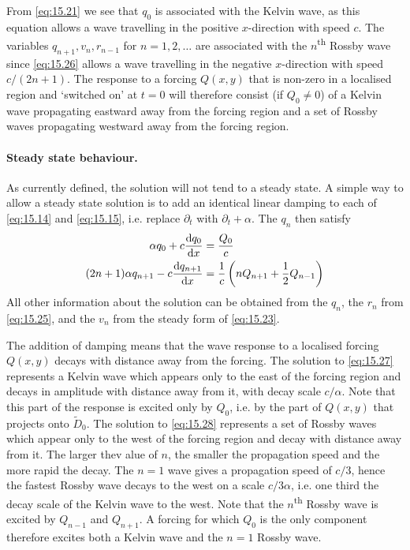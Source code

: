 \documentclass{jknotes}
\begin{document}
From \eqref{eq:15.21} we see that $q_0$ is associated with the Kelvin wave, as
this equation allows a wave travelling in the positive $x$-direction with
speed $c$. The variables $q_{n+1}, v_n, r_{n-1}$ for $n = 1, 2, \dots$ are
associated with the $n$\textsuperscript{th} Rossby wave since
\eqref{eq:15.26} allows a wave travelling in the negative $x$-direction with
speed $c/(2n+1)$. The response to a forcing $Q(x,y)$ that is non-zero in a
localised region and `switched on' at $t=0$ will therefore consist (if $Q_0
\ne 0$) of a Kelvin wave propagating eastward away from the forcing region and
a set of Rossby waves propagating westward away from the forcing region. 

\paragraph{Steady state behaviour.} As currently defined, the solution will
not tend to a steady state. A simple way to allow a steady state solution is
to add an identical linear damping to each of \eqref{eq:15.14} and
\eqref{eq:15.15}, i.e. replace $\partial_t$ with $\partial_t + \alpha$. The
$q_n$ then satisfy
\begin{align}
	\alpha q_0 + c \frac{\diffd q_0}{\diffd x} &= \frac{Q_0}{c}
	\label{eq:15.27}\\
	(2n+1)\alpha q_{n+1} - c\frac{\diffd q_{n+1}}{\diffd x} &=
	\frac{1}{c}\left(nQ_{n+1}+\frac{1}{2}Q_{n-1}\right)\label{eq:15.28}
\end{align}
All other information about the solution can be obtained from the $q_n$, the
$r_n$ from \eqref{eq:15.25}, and the $v_n$ from the steady form of
\eqref{eq:15.23}.

The addition of damping means that the wave response to a localised forcing
$Q(x,y)$ decays with distance away from the forcing. The solution to
\eqref{eq:15.27} represents a Kelvin wave which appears only to the east of
the forcing region and decays in amplitude with distance away from it, with
decay scale $c/\alpha$. Note that this part of the response is excited only by
$Q_0$, i.e. by the part of $Q(x,y)$ that projects onto $\tilde{D}_0$. The
solution to \eqref{eq:15.28} represents a set of Rossby waves which appear
only to the west of the forcing region and decay with distance away from it.
The larger thev alue of $n$, the smaller the propagation speed and the more
rapid the decay. The $n=1$ wave gives a propagation speed of $c/3$, hence the
fastest Rossby wave decays to the west on a scale $c/3\alpha$, i.e. one third
the decay scale of the Kelvin wave to the west. Note that the
$n$\textsuperscript{th} Rossby wave is excited by $Q_{n-1}$ and $Q_{n+1}$. A
forcing for which $Q_0$ is the only component therefore excites both a Kelvin
wave and the $n=1$ Rossby wave. 
\end{document}
